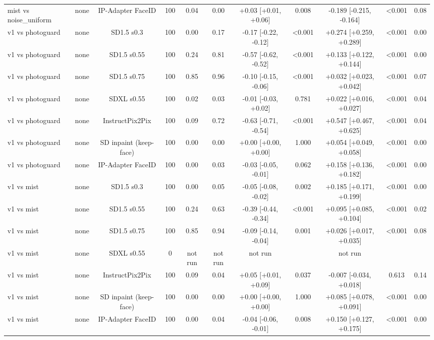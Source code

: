 \begin{table}[t]
{\begin{tabular}{lcccccccccc}
mist vs noise\_uniform & none & IP-Adapter FaceID & 100 & 0.04 & 0.00 & +0.03 [+0.01, +0.06] & 0.008 & -0.189 [-0.215, -0.164] & <0.001 & 0.08 \\
v1 vs photoguard & none & SD1.5 s0.3 & 100 & 0.00 & 0.17 & -0.17 [-0.22, -0.12] & <0.001 & +0.274 [+0.259, +0.289] & <0.001 & 0.00 \\
v1 vs photoguard & none & SD1.5 s0.55 & 100 & 0.24 & 0.81 & -0.57 [-0.62, -0.52] & <0.001 & +0.133 [+0.122, +0.144] & <0.001 & 0.00 \\
v1 vs photoguard & none & SD1.5 s0.75 & 100 & 0.85 & 0.96 & -0.10 [-0.15, -0.06] & <0.001 & +0.032 [+0.023, +0.042] & <0.001 & 0.07 \\
v1 vs photoguard & none & SDXL s0.55 & 100 & 0.02 & 0.03 & -0.01 [-0.03, +0.02] & 0.781 & +0.022 [+0.016, +0.027] & <0.001 & 0.04 \\
v1 vs photoguard & none & InstructPix2Pix & 100 & 0.09 & 0.72 & -0.63 [-0.71, -0.54] & <0.001 & +0.547 [+0.467, +0.625] & <0.001 & 0.04 \\
v1 vs photoguard & none & SD inpaint (keep-face) & 100 & 0.00 & 0.00 & +0.00 [+0.00, +0.00] & 1.000 & +0.054 [+0.049, +0.058] & <0.001 & 0.00 \\
v1 vs photoguard & none & IP-Adapter FaceID & 100 & 0.00 & 0.03 & -0.03 [-0.05, -0.01] & 0.062 & +0.158 [+0.136, +0.182] & <0.001 & 0.00 \\
v1 vs mist & none & SD1.5 s0.3 & 100 & 0.00 & 0.05 & -0.05 [-0.08, -0.02] & 0.002 & +0.185 [+0.171, +0.199] & <0.001 & 0.00 \\
v1 vs mist & none & SD1.5 s0.55 & 100 & 0.24 & 0.63 & -0.39 [-0.44, -0.34] & <0.001 & +0.095 [+0.085, +0.104] & <0.001 & 0.02 \\
v1 vs mist & none & SD1.5 s0.75 & 100 & 0.85 & 0.94 & -0.09 [-0.14, -0.04] & 0.001 & +0.026 [+0.017, +0.035] & <0.001 & 0.08 \\
v1 vs mist & none & SDXL s0.55 & 0 & not run & not run & not run &  & not run &  &  \\
v1 vs mist & none & InstructPix2Pix & 100 & 0.09 & 0.04 & +0.05 [+0.01, +0.09] & 0.037 & -0.007 [-0.034, +0.018] & 0.613 & 0.14 \\
v1 vs mist & none & SD inpaint (keep-face) & 100 & 0.00 & 0.00 & +0.00 [+0.00, +0.00] & 1.000 & +0.085 [+0.078, +0.091] & <0.001 & 0.00 \\
v1 vs mist & none & IP-Adapter FaceID & 100 & 0.00 & 0.04 & -0.04 [-0.06, -0.01] & 0.008 & +0.150 [+0.127, +0.175] & <0.001 & 0.00 \\
\bottomrule
\end{tabular}
}
\end{table}
